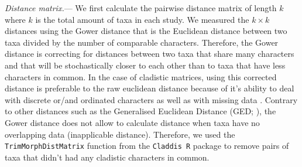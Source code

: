 \documentclass[12pt,letterpaper]{article}
\renewcommand{\subsubsection}[1]{%
\vspace{2ex}
\noindent
\textit{#1.}---}
\begin{document}
\subsubsection{Distance matrix}
We first calculate the pairwise distance matrix of length $k$ where $k$ is the total amount of taxa in each study.
We measured the $k \times k$ distances using the Gower distance \citep{Gower71} that is the Euclidean distance between two taxa divided by the number of comparable characters. 
Therefore, the Gower distance is correcting for distances between two taxa that share many characters and that will be stochastically closer to each other than to taxa that have less characters in common.
In the case of cladistic matrices, using this corrected distance is preferable to the raw euclidean distance because of it's ability to deal with discrete or/and ordinated characters as well as with missing data \citep{anderson2012using}.
Contrary to other distances such as the Generalised Euclidean Distance (GED; \citealt{Wills2001}), the Gower distance does not allow to calculate distance when taxa have no overlapping data (inapplicable distance).
Therefore, we used the \texttt{TrimMorphDistMatrix} function from the \texttt{Claddis R} package \citep{Claddis} to remove pairs of taxa that didn't had any cladistic characters in common.
\end{document}

